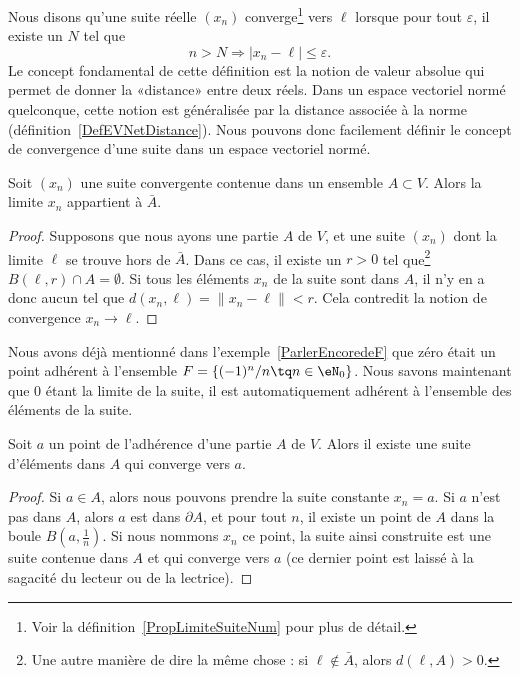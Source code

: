 Nous disons qu'une suite réelle $(x_n)$ converge\footnote{Voir la définition~\ref{PropLimiteSuiteNum} pour plus de détail.} vers $\ell$ lorsque pour tout $\varepsilon$, il existe un $N$ tel que
\begin{equation}
	n>N\Rightarrow | x_n-\ell |\leq\varepsilon.
\end{equation}
Le concept fondamental de cette définition est la notion de valeur absolue qui permet de donner la «distance» entre deux réels. Dans un espace vectoriel normé quelconque, cette notion est généralisée par la distance associée à la norme (définition~\ref{DefEVNetDistance}). Nous pouvons donc facilement définir le concept de convergence d'une suite dans un espace vectoriel normé.


\begin{lemma}		\label{LemLimAbarA}
	Soit $(x_n)$ une suite convergente contenue dans un ensemble $A\subset V$. Alors la limite $x_n$ appartient à $\bar A$.
\end{lemma}

\begin{proof}
	Supposons que nous ayons une partie $A$ de $V$, et une suite $(x_n)$ dont la limite $\ell$ se trouve hors de $\bar A$. Dans ce cas, il existe un $r>0$ tel que\footnote{Une autre manière de dire la même chose : si $\ell\notin\bar A$, alors $d(\ell,A)>0$.} $B(\ell,r)\cap A=\emptyset$. Si tous les éléments $x_n$ de la suite sont dans $A$, il n'y en a donc aucun tel que $d(x_n,\ell)=\| x_n-\ell \|<r$. Cela contredit la notion de convergence $x_n\to \ell$.
\end{proof}

Nous avons déjà mentionné dans l'exemple~\ref{ParlerEncoredeF} que zéro était un point adhérent à l'ensemble $F=\{ (-1)^n/n\tq n\in\eN_0 \}$. Nous savons maintenant que $0$ étant la limite de la suite, il est automatiquement adhérent à l'ensemble des éléments de la suite.

\begin{corollary}		\label{CorAdhEstLim}
	Soit $a$ un point de l'adhérence d'une partie $A$ de $V$. Alors il existe une suite d'éléments dans $A$ qui converge vers $a$.
\end{corollary}

\begin{proof}
	Si $a\in A$, alors nous pouvons prendre la suite constante $x_n=a$. Si $a$ n'est pas dans $A$, alors $a$ est dans $\partial A$, et pour tout $n$, il existe un point de $A$ dans la boule $B(a,\frac{1}{ n })$. Si nous nommons $x_n$ ce point, la suite ainsi construite est une suite contenue dans $A$ et qui converge vers $a$ (ce dernier point est laissé à la sagacité du lecteur ou de la lectrice).
\end{proof}

